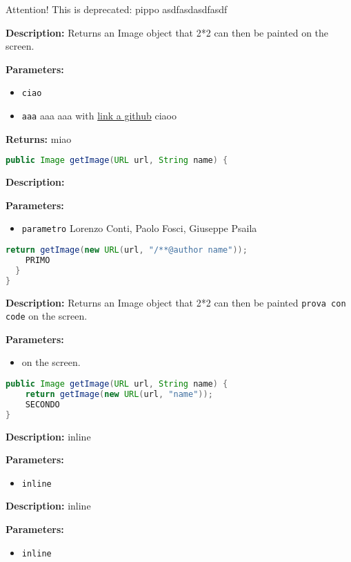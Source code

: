 Attention! This is deprecated: pippo asdfasdasdfasdf

\textbf{Description:}
 Returns an Image object that 2*2 can then be painted on the screen. 

\textbf{Parameters:}
\begin{itemize}
  \item\texttt{ciao} 
  \item\texttt{aaa} aaa aaa with \href{https://github.com/test}{link a github}  ciaoo
\end{itemize}

\textbf{Returns:}
miao

\begin{lstlisting}[language=Java]
public Image getImage(URL url, String name) {
\end{lstlisting}
\textbf{Description:}
 

\textbf{Parameters:}
\begin{itemize}
  \item\texttt{parametro} Lorenzo Conti, Paolo Fosci, Giuseppe Psaila
\end{itemize}

\begin{lstlisting}[language=Java]
    return getImage(new URL(url, "/**@author name"));
    PRIMO
  }
}
\end{lstlisting}
\textbf{Description:}
Returns an Image object that 2*2 can then be painted \texttt{prova con code} on the screen.

\textbf{Parameters:}
\begin{itemize}
  \item\texttt{} on the screen.
\end{itemize}

\begin{lstlisting}[language=Java]
public Image getImage(URL url, String name) {
    return getImage(new URL(url, "name"));
    SECONDO
}
\end{lstlisting}
\textbf{Description:}
inline

\textbf{Parameters:}
\begin{itemize}
  \item\texttt{inline} 
\end{itemize}

\textbf{Description:}
inline

\textbf{Parameters:}
\begin{itemize}
  \item\texttt{inline} 
\end{itemize}

